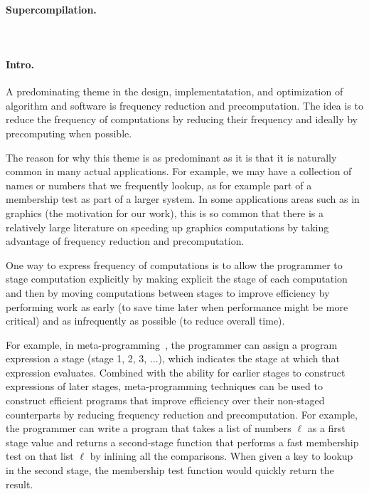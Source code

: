 \paragraph{Supercompilation.}
~\cite{Turchin86}


\paragraph{Intro.}

A predominating theme in the design, implementatation, and
optimization of algorithm and software is frequency reduction and
precomputation.  The idea is to reduce the frequency of computations
by reducing their frequency and ideally by precomputing when possible.


The reason for why this theme is as predominant as it is that it is
naturally common in many actual applications.  For example, we may
have a collection of names or numbers that we frequently lookup, as
for example part of a membership test as part of a larger system.  In
some applications areas such as in graphics (the motivation for our
work), this is so common that there is a relatively large literature
on speeding up graphics computations by taking advantage of frequency
reduction and precomputation.

One way to express frequency of computations is to allow the
programmer to stage computation explicitly by making explicit the
stage of each computation and then by moving computations between
stages to improve efficiency by performing work as early (to save time
later when performance might be more critical) and  as infrequently
as possible (to reduce overall time).






For example, in meta-programming~\cite{}, the programmer can assign a
program expression a stage (stage 1, 2, 3, ...), which indicates the
stage at which that expression evaluates.  Combined with the ability
for earlier stages to construct expressions of later stages,
meta-programming techniques can be used to construct efficient
programs that improve efficiency over their non-staged counterparts by
reducing frequency reduction and precomputation.  For example, the
programmer can write a program that takes a list of numbers $\ell$ as
a first stage value and returns a second-stage function that performs
a fast membership test on that list $\ell$ by inlining all the
comparisons.  When given a key to lookup in the second stage, the
membership test function would quickly return the result.




